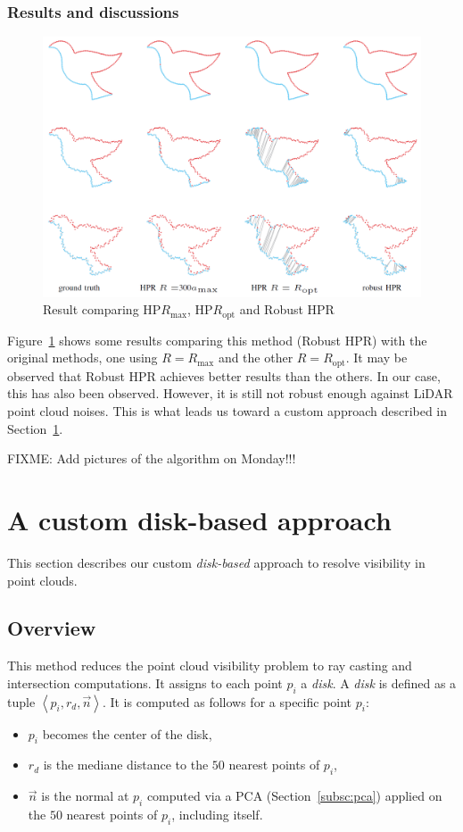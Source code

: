 \subsubsection{Results and discussions}
\begin{figure}[h]
  \centering
  \includegraphics[scale=0.35]{img/rhpr-result.png}
  \caption{Result comparing HP$R_\text{max}$, HP$R_\text{opt}$ and Robust HPR}
  \label{fig:rhpr-result}
\end{figure}

Figure~\ref{fig:rhpr-result} shows some results comparing this method (Robust HPR) with the original methods, one using $R = R_\text{max}$ and the other $R = R_\text{opt}$. It may be observed that Robust HPR achieves better results than the others. In our case, this has also been observed. However, it is still not robust enough against LiDAR point cloud noises. This is what leads us toward a custom approach described in Section~\ref{sc:custom}.

FIXME: Add pictures of the algorithm on Monday!!!

\section{A custom disk-based approach}
\label{sc:custom}
This section describes our custom \emph{disk-based} approach to resolve visibility in point clouds.

\subsection{Overview}
\label{subsc:custom-overview}
This method reduces the point cloud visibility problem to ray casting and intersection computations. It assigns to each point $p_i$ a \emph{disk}. A \emph{disk} is defined as a tuple $\left\langle p_i, r_d, \vec{n} \right\rangle$. It is computed as follows for a specific point $p_i$:
\begin{itemize}
  \item $p_i$ becomes the center of the disk,
  \item $r_d$ is the mediane distance to the $50$ nearest points of $p_i$,
  \item $\vec{n}$ is the normal at $p_i$ computed via a PCA (Section~\ref{subsc:pca}) applied on the $50$ nearest points of $p_i$, including itself.
\end{itemize}

